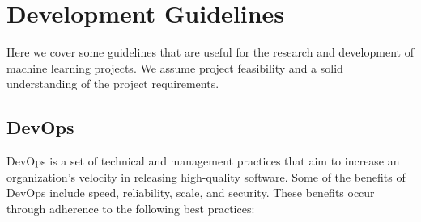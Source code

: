 \section{Development Guidelines}
Here we cover some guidelines that are useful for the research and
development of machine learning projects. We assume project 
feasibility and a solid understanding of the project requirements.


\subsection{DevOps}
DevOps is a set of technical and management practices that aim to increase an organization’s
velocity in releasing high-quality software. Some of the benefits of DevOps
include speed, reliability, scale, and security. These benefits occur through adherence
to the following best practices:
